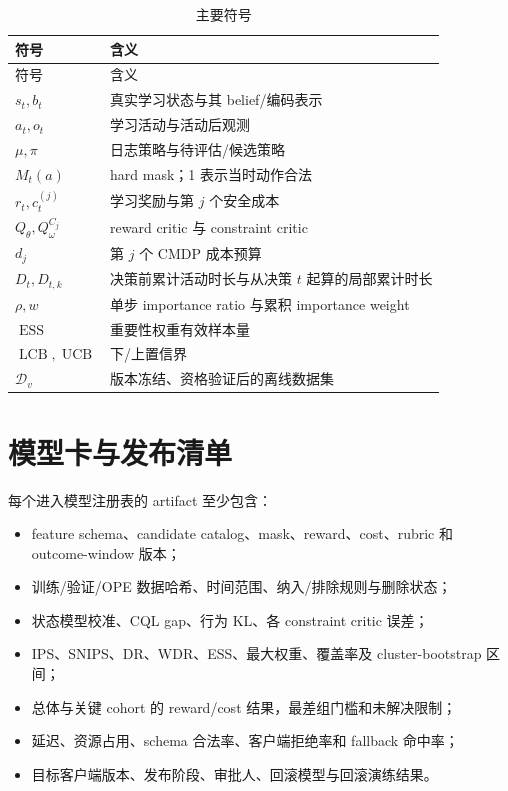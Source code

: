 \documentclass[11pt,a4paper,fontset=none]{ctexart}
\DeclareMathOperator{\ESS}{ESS}
\newcommand{\1}{\mathbb{I}}
\newcommand{\D}{\mathcal{D}}
\begin{document}
\begin{longtable}{C{22mm}L{115mm}}
  \caption{主要符号}\label{tab:symbols}\\
  \toprule
  符号 & 含义 \\
  \midrule
  \endfirsthead
  \toprule
  符号 & 含义 \\
  \midrule
  \endhead
  \bottomrule
  \endfoot
  $s_t,b_t$ & 真实学习状态与其 belief/编码表示 \\
  $a_t,o_t$ & 学习活动与活动后观测 \\
  $\mu,\pi$ & 日志策略与待评估/候选策略 \\
  $M_t(a)$ & hard mask；1 表示当时动作合法 \\
  $r_t,c_t^{(j)}$ & 学习奖励与第 $j$ 个安全成本 \\
  $Q_\theta,Q^{C_j}_\omega$ & reward critic 与 constraint critic \\
  $d_j$ & 第 $j$ 个 CMDP 成本预算 \\
  $D_t,D_{t,k}$ & 决策前累计活动时长与从决策 $t$ 起算的局部累计时长 \\
  $\rho,w$ & 单步 importance ratio 与累积 importance weight \\
  $\ESS$ & 重要性权重有效样本量 \\
  $\operatorname{LCB},\operatorname{UCB}$ & 下/上置信界 \\
  $\D_v$ & 版本冻结、资格验证后的离线数据集 \\
\end{longtable}

\section{模型卡与发布清单}

每个进入模型注册表的 artifact 至少包含：
\begin{itemize}
  \item feature schema、candidate catalog、mask、reward、cost、rubric 和 outcome-window 版本；
  \item 训练/验证/OPE 数据哈希、时间范围、纳入/排除规则与删除状态；
  \item 状态模型校准、CQL gap、行为 KL、各 constraint critic 误差；
  \item IPS、SNIPS、DR、WDR、ESS、最大权重、覆盖率及 cluster-bootstrap 区间；
  \item 总体与关键 cohort 的 reward/cost 结果，最差组门槛和未解决限制；
  \item 延迟、资源占用、schema 合法率、客户端拒绝率和 fallback 命中率；
  \item 目标客户端版本、发布阶段、审批人、回滚模型与回滚演练结果。
\end{itemize}
\end{document}
